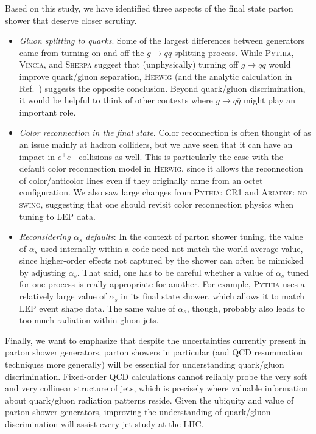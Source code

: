 \documentclass[11pt]{cernrep}
\begin{document}
Based on this study, we have identified three aspects of the final state parton shower that deserve closer scrutiny.
\begin{itemize}
\item \textit{Gluon splitting to quarks}.  Some of the largest differences between generators came from turning on and off the $g \to q \overline{q}$ splitting process.  While \textsc{Pythia}, \textsc{Vincia}, and \textsc{Sherpa} suggest that (unphysically) turning off $g \to q \overline{q}$ would improve quark/gluon separation, \textsc{Herwig} (and the analytic calculation in Ref.~\cite{Larkoski:2013eya}) suggests the opposite conclusion.  Beyond quark/gluon discrimination, it would be helpful to think of other contexts where $g \to q \overline{q}$ might play an important role.
\item \textit{Color reconnection in the final state}.  Color reconnection is often thought of as an issue mainly at hadron colliders, but we have seen that it can have an impact in $e^+ e^-$ collisions as well.  This is particularly the case with the default color reconnection model in \textsc{Herwig}, since it allows the reconnection of color/anticolor lines even if they originally came from an octet configuration.  We also saw large changes from \textsc{Pythia: CR1} and  \textsc{Ariadne: no swing}, suggesting that one should revisit color reconnection physics when tuning to LEP data.
\item \textit{Reconsidering $\alpha_s$ defaults}:  In the context of parton shower tuning, the value of $\alpha_s$ used internally within a code need not match the world average value, since higher-order effects not captured by the shower can often be mimicked by adjusting $\alpha_s$.  That said, one has to be careful whether a value of $\alpha_s$ tuned for one process is really appropriate for another.  For example, \textsc{Pythia} uses a relatively large value of $\alpha_s$ in its final state shower, which allows it to match LEP event shape data.  The same value of $\alpha_s$, though, probably also leads to too much radiation within gluon jets.
\end{itemize}
Finally, we want to emphasize that despite the uncertainties currently present in parton shower generators, parton showers in particular (and QCD resummation techniques more generally) will be essential for understanding quark/gluon discrimination.  Fixed-order QCD calculations cannot reliably probe the very soft and very collinear structure of jets, which is precisely where valuable information about quark/gluon radiation patterns reside.  Given the ubiquity and value of parton shower generators, improving the understanding of quark/gluon discrimination will assist every jet study at the LHC.
\end{document}
